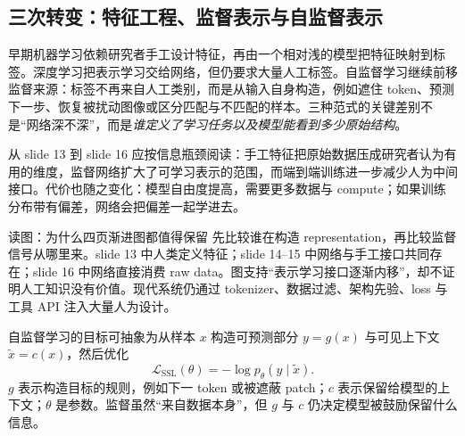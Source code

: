 \subsection{三次转变：特征工程、监督表示与自监督表示}

早期机器学习依赖研究者手工设计特征，再由一个相对浅的模型把特征映射到标签。深度学习把表示学习交给网络，但仍要求大量人工标签。自监督学习继续前移监督来源：标签不再来自人工类别，而是从输入自身构造，例如遮住 token、预测下一步、恢复被扰动图像或区分匹配与不匹配的样本。三种范式的关键差别不是“网络深不深”，而是\emph{谁定义了学习任务以及模型能看到多少原始结构}。



从 slide 13 到 slide 16 应按信息瓶颈阅读：手工特征把原始数据压成研究者认为有用的维度，监督网络扩大了可学习表示的范围，而端到端训练进一步减少人为中间接口。代价也随之变化：模型自由度提高，需要更多数据与 compute；如果训练分布带有偏差，网络会把偏差一起学进去。



\begin{knowledgebox}{读图：为什么四页渐进图都值得保留}
先比较谁在构造 representation，再比较监督信号从哪里来。slide 13 中人类定义特征；slide 14--15 中网络与手工接口共同存在；slide 16 中网络直接消费 raw data。图支持“表示学习接口逐渐内移”，却不证明人工知识没有价值。现代系统仍通过 tokenizer、数据过滤、架构先验、loss 与工具 API 注入大量人为设计。
\end{knowledgebox}

自监督学习的目标可抽象为从样本 $x$ 构造可预测部分 $y=g(x)$ 与可见上下文 $\tilde{x}=c(x)$，然后优化
\[
\mathcal{L}_{\mathrm{SSL}}(\theta)
=-\log p_{\theta}\!\left(y\mid \tilde{x}\right).
\]
$g$ 表示构造目标的规则，例如下一 token 或被遮蔽 patch；$c$ 表示保留给模型的上下文；$\theta$ 是参数。监督虽然“来自数据本身”，但 $g$ 与 $c$ 仍决定模型被鼓励保留什么信息。



